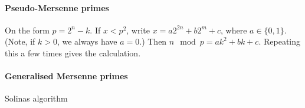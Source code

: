 \paragraph{Pseudo-Mersenne primes}
On the form $p = 2^n-k$.
If $x < p^2$, write $x = a 2^{2n} + b 2^m + c$,
where $a\in\{0,1\}$.
(Note, if $k > 0$, we always have $a=0$.)
Then $n \mod p = ak^2+bk+c$.
Repeating this a few times gives the calculation.


\paragraph{Generalised Mersenne primes}
Solinas algorithm

